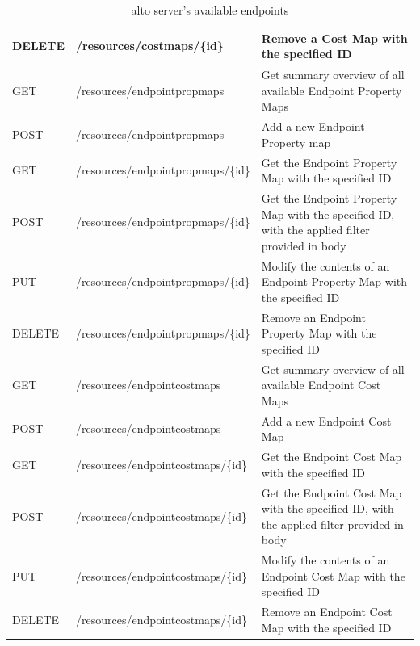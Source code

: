 \begin{table}[]
{\begin{tabular}{|l|l|l|}
DELETE    & /resources/costmaps/\{id\}         & Remove a Cost Map with the specified ID                                                       \\ \hline
GET       & /resources/endpointpropmaps        & Get summary overview of all available Endpoint Property Maps                                  \\ \hline
POST      & /resources/endpointpropmaps        & Add a new Endpoint Property map                                                               \\ \hline
GET       & /resources/endpointpropmaps/\{id\} & Get the Endpoint Property Map with the specified ID                                           \\ \hline
POST      & /resources/endpointpropmaps/\{id\} & Get the Endpoint Property Map with the specified ID, with the applied filter provided in body \\ \hline
PUT       & /resources/endpointpropmaps/\{id\} & Modify the contents of an Endpoint Property Map with the specified ID                         \\ \hline
DELETE    & /resources/endpointpropmaps/\{id\} & Remove an Endpoint Property Map with the specified ID                                         \\ \hline
GET       & /resources/endpointcostmaps        & Get summary overview of all available Endpoint Cost Maps                                      \\ \hline
POST      & /resources/endpointcostmaps        & Add a new Endpoint Cost Map                                                                   \\ \hline
GET       & /resources/endpointcostmaps/\{id\} & Get the Endpoint Cost Map with the specified ID                                               \\ \hline
POST      & /resources/endpointcostmaps/\{id\} & Get the Endpoint Cost Map with the specified ID, with the applied filter provided in body     \\ \hline
PUT       & /resources/endpointcostmaps/\{id\} & Modify the contents of an Endpoint Cost Map with the specified ID                             \\ \hline
DELETE    & /resources/endpointcostmaps/\{id\} & Remove an Endpoint Cost Map with the specified ID                                             \\ \hline
\end{tabular}}
\caption{\gls{alto} server's available endpoints}
\label{table:alto-server-api}
\end{table}


